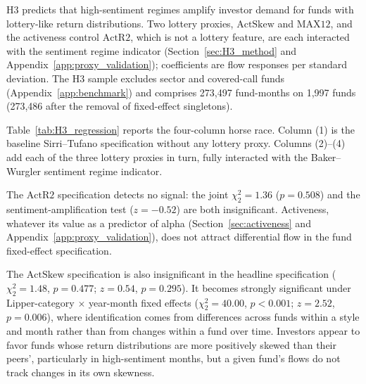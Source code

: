 \documentclass[12pt, oneside]{report}
\begin{document}
H3 predicts that high-sentiment regimes amplify investor demand for funds
with lottery-like return distributions. Two lottery proxies,
$\text{ActSkew}$ and $\text{MAX12}$, and the activeness control
$\text{ActR2}$, which is not a lottery feature, are each interacted with
the sentiment regime indicator (Section~\ref{sec:H3_method} and
Appendix~\ref{app:proxy_validation}); coefficients are flow responses per
standard deviation. The H3 sample excludes sector and
covered-call funds (Appendix~\ref{app:benchmark}) and comprises 273{,}497
fund-months on 1{,}997 funds (273{,}486 after the removal of fixed-effect
singletons).

Table~\ref{tab:H3_regression} reports the four-column horse race.
Column (1) is the baseline Sirri--Tufano specification without any
lottery proxy. Columns (2)--(4) add each of the three lottery proxies in
turn, fully interacted with the Baker--Wurgler sentiment regime
indicator.



The $\text{ActR2}$ specification detects no signal: the joint
$\chi^2_2 = 1.36$ ($p = 0.508$) and the sentiment-amplification test
($z = -0.52$) are both insignificant. Activeness, whatever its value as a
predictor of alpha (Section~\ref{sec:activeness} and
Appendix~\ref{app:proxy_validation}), does not attract differential flow
in the fund fixed-effect specification.

The $\text{ActSkew}$ specification is also insignificant in the headline
specification ($\chi^2_2 = 1.48$, $p = 0.477$; $z = 0.54$, $p = 0.295$).
It becomes strongly significant under Lipper-category $\times$ year-month
fixed effects ($\chi^2_2 = 40.00$, $p < 0.001$; $z = 2.52$, $p = 0.006$),
where identification comes from differences across funds within a style
and month rather than from changes within a fund over time. Investors
appear to favor funds whose return distributions are more positively
skewed than their peers', particularly in high-sentiment months, but a
given fund's flows do not track changes in its own skewness.
\end{document}
